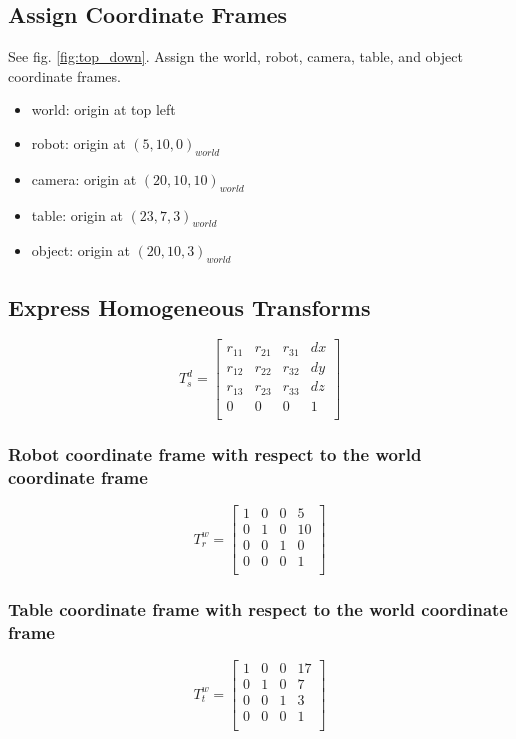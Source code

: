 \documentclass[11pt, oneside]{article}   	%
\begin{document}
\subsection{Assign Coordinate Frames}
See fig. \ref{fig:top_down}.
Assign the world, robot, camera, table, and object coordinate frames.
\begin{itemize}
  \item world: origin at top left
  \item robot: origin at $(5, 10, 0)_{world}$
  \item camera: origin at $(20, 10, 10)_{world}$
  \item table: origin at $(23, 7, 3)_{world}$
  \item object: origin at $(20, 10, 3)_{world}$
\end{itemize}

\subsection{Express Homogeneous Transforms}
$$ T_s^d = 
\begin{bmatrix} 
r_{11} & r_{21} & r_{31} & dx \\
r_{12} & r_{22} & r_{32} & dy \\
r_{13} & r_{23} & r_{33} & dz \\
0 & 0 & 0 & 1 \\
\end{bmatrix}
$$
\subsubsection{Robot coordinate frame with respect to the world coordinate frame}
$$ T_r^w = 
\begin{bmatrix} 
1 & 0 & 0 & 5 \\
0 & 1 & 0 & 10 \\
0 & 0 & 1 & 0 \\
0 & 0 & 0 & 1 \\
\end{bmatrix}
$$
\subsubsection{Table coordinate frame with respect to the world coordinate frame}
$$ T_t^w =
\begin{bmatrix} 
1 & 0 & 0 & 17 \\
0 & 1 & 0 & 7 \\
0 & 0 & 1 & 3 \\
0 & 0 & 0 & 1 \\
\end{bmatrix}
$$
\end{document}
